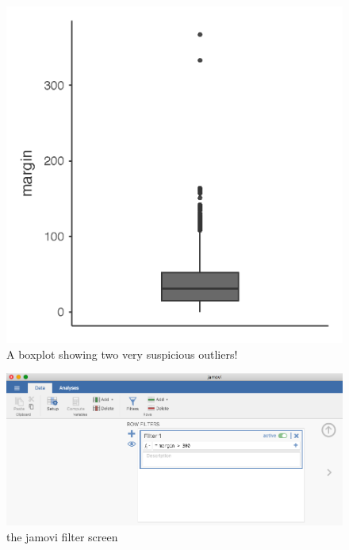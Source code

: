 \documentclass[
]{book}
\begin{document}
\begin{figure}

{\centering \includegraphics[width=1\linewidth]{img/graphics/boxplot4} 

}

\caption{A boxplot showing two very suspicious outliers!}\label{fig:boxplot4}
\end{figure}

\begin{figure}

{\centering \includegraphics[width=1\linewidth]{img/graphics/filter1} 

}

\caption{the jamovi filter screen}\label{fig:filter1}
\end{figure}
\end{document}
